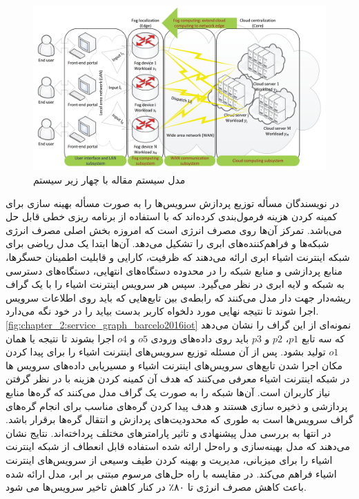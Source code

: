     \begin{figure}[h]
      \centerline{\includegraphics[width=12cm]{graphics/chapter_2/system_model_deng2016optimal}}
      \caption{مدل سیستم مقاله \cite{deng2016optimal} با چهار زیر سیستم}
      \label{fig:chapter_2:system_model_deng2016optimal}
    \end{figure}

    در \cite{barcelo2016iot} نویسندگان مسأله توزیع پردازش سرویس‌ها‌ را به صورت مسأله بهینه سازی برای کمینه کردن هزینه فرمول‌بندی کرده‌اند که با استفاده از برنامه ریزی خطی قابل حل می‌باشد.
    تمرکز آن‌ها روی مصرف انرژی است که امروزه بخش اصلی مصرف انرژی شبکه‌ها و فراهم‌کننده‌های ابری را تشکیل می‌دهد.
    آن‌ها ابتدا یک مدل ریاضی برای شبکه اینترنت اشیاء ابری ارائه می‌دهند که ظرفیت، کارایی و قابلیت اطمینان حسگر‌ها، منابع پردازشی و منابع شبکه را در محدوده دستگاه‌های انتهایی، دستگاه‌های دسترسی به شبکه و لایه ابری در نظر می‌گیرد.
    سپس هر سرویس اینترنت اشیاء را با یک گراف ریشه‌دار جهت دار مدل می‌کنند که رابطه‌ی بین تابع‌هایی که باید روی اطلاعات سرویس اجرا شوند تا نتیجه نهایی مورد دلخواه کاربر بدست بیاید را در خود نگه می‌دارد.
    \cref{fig:chapter_2:service_graph_barcelo2016iot} نمونه‌ای از این گراف را نشان می‌دهد که سه تابع $p1$، $p2$ و $p3$ باید روی داده‌های ورودی $o5$ و $o4$ اجرا بشوند تا نتیجه یا همان $o1$ تولید بشود.
    پس از آن مسئله توزیع سرویس‌های اینترنت اشیاء را برای پیدا کردن مکان اجرا شدن تابع‌های سرویس‌های اینترنت اشیاء و مسیریابی داده‌های سرویس ها در شبکه اینترنت اشیاء معرفی می‌کنند که هدف آن کمینه کردن هزینه با در نظر گرفتن نیاز کاربران است.
    آن‌ها شبکه را به صورت یک گراف مدل می‌کنند که گره‌ها منابع پردازشی و ذخیره سازی هستند و هدف پیدا کردن گره‌های مناسب برای انجام گره‌های گراف‌ سرویس‌ها است به طوری که محدودیت‌های پردازش و انتقال گره‌ها برقرار باشد.
    در انتها به بررسی مدل پیشنهادی و تاثیر پارامتر‌های مختلف پرداخته‌اند. 
    نتایج نشان می‌دهند که مدل بهینه‌سازی و راه‌حل ارائه شده استفاده قابل انعطاف از شبکه اینترنت اشیاء را برای میزبانی، مدیریت و بهینه کردن طیف وسیعی از سرویس‌های اینترنت اشیاء فراهم می‌کند.
    در مقایسه با راه حل‌های مرسوم مبتنی بر ابر، مدل ارائه شده باعث کاهش مصرف انرژی تا ۸۰٪ در کنار کاهش تاخیر سرویس‌ها می شود.

